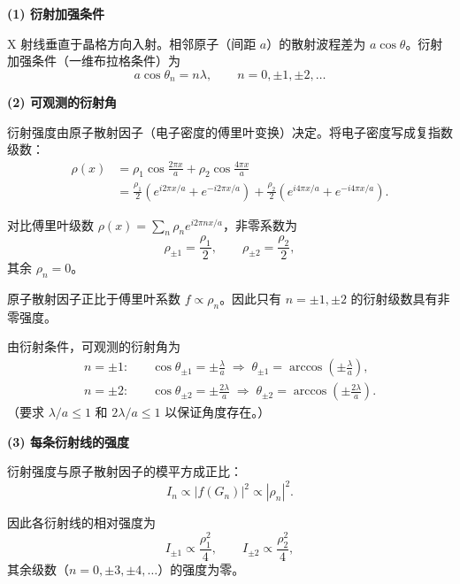 \begin{derivationbox}[标准解题过程]
\textbf{(1) 衍射加强条件}

X 射线垂直于晶格方向入射。相邻原子（间距 $a$）的散射波程差为 $a\cos\theta$。衍射加强条件（一维布拉格条件）为
\begin{equation}
\boxed{a\cos\theta_n=n\lambda,\qquad n=0,\pm1,\pm2,\ldots}
\end{equation}

\textbf{(2) 可观测的衍射角}

衍射强度由原子散射因子（电子密度的傅里叶变换）决定。将电子密度写成复指数级数：
\begin{align}
\rho(x)&=\rho_1\cos\frac{2\pi x}{a}+\rho_2\cos\frac{4\pi x}{a}\\
&=\frac{\rho_1}{2}\left(e^{i2\pi x/a}+e^{-i2\pi x/a}\right)
+\frac{\rho_2}{2}\left(e^{i4\pi x/a}+e^{-i4\pi x/a}\right).
\end{align}

对比傅里叶级数 $\rho(x)=\sum_n\rho_n e^{i2\pi nx/a}$，非零系数为
\begin{equation}
\rho_{\pm1}=\frac{\rho_1}{2},\qquad\rho_{\pm2}=\frac{\rho_2}{2},
\end{equation}
其余 $\rho_n=0$。

原子散射因子正比于傅里叶系数 $f\propto\rho_n$。因此只有 $n=\pm1,\pm2$ 的衍射级数具有非零强度。

由衍射条件，可观测的衍射角为
\begin{align}
n=\pm1:&\quad\cos\theta_{\pm1}=\pm\frac{\lambda}{a}\;\Rightarrow\;\theta_{\pm1}=\arccos\!\left(\pm\frac{\lambda}{a}\right),\\
n=\pm2:&\quad\cos\theta_{\pm2}=\pm\frac{2\lambda}{a}\;\Rightarrow\;\theta_{\pm2}=\arccos\!\left(\pm\frac{2\lambda}{a}\right).
\end{align}
（要求 $\lambda/a\le1$ 和 $2\lambda/a\le1$ 以保证角度存在。）

\textbf{(3) 每条衍射线的强度}

衍射强度与原子散射因子的模平方成正比：
\begin{equation}
I_n\propto|f(G_n)|^2\propto|\rho_n|^2.
\end{equation}

因此各衍射线的相对强度为
\begin{equation}
\boxed{I_{\pm1}\propto\frac{\rho_1^2}{4},\qquad I_{\pm2}\propto\frac{\rho_2^2}{4},}
\end{equation}
其余级数（$n=0,\pm3,\pm4,\ldots$）的强度为零。
\end{derivationbox}

